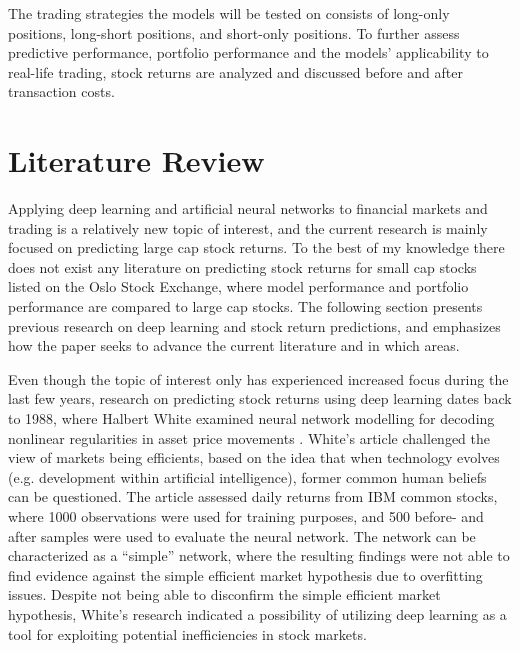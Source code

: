 \indent \newline
The trading strategies the models will be tested on consists of long-only positions, long-short positions, and short-only positions. To further assess predictive performance, portfolio performance and the models' applicability to real-life trading, stock returns are analyzed and discussed before and after transaction costs. 

\section{Literature Review}
Applying deep learning and artificial neural networks to financial markets and trading is a relatively new topic of interest, and the current research is mainly focused on predicting large cap stock returns. To the best of my knowledge there does not exist any literature on predicting stock returns for small cap stocks listed on the Oslo Stock Exchange, where model performance and portfolio performance are compared to large cap stocks. The following section presents previous research on deep learning and stock return predictions, and emphasizes how the paper seeks to advance the current literature and in which areas.     

\indent\newline
Even though the topic of interest only has experienced increased focus during the last few years, research on predicting stock returns using deep learning dates back to 1988, where Halbert White examined neural network modelling for decoding nonlinear regularities in asset price movements \cite{white}. White’s article challenged the view of markets being efficients, based on the idea that when technology evolves (e.g. development within artificial intelligence), former common human beliefs can be questioned. The article assessed daily returns from IBM common stocks, where 1000 observations were used for training purposes, and 500 before- and after samples were used to evaluate the neural network. The network can be characterized as a “simple” network, where the resulting findings were not able to find evidence against the simple efficient market hypothesis due to overfitting issues. Despite not being able to disconfirm the simple efficient market hypothesis, White’s research indicated a possibility of utilizing deep learning as a tool for exploiting potential inefficiencies in stock markets.  

